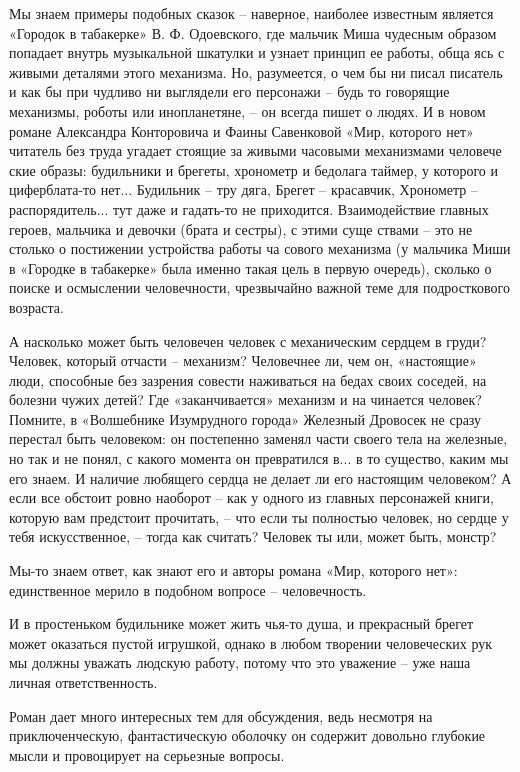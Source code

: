 Мы знаем примеры подобных сказок – наверное, наиболее известным является
«Городок в табакерке» В. Ф. Одоевского, где мальчик Миша чудесным образом
попадает внутрь музыкальной шкатулки и узнает принцип ее работы, обща ясь с
живыми деталями этого механизма.  Но, разумеется, о чем бы ни писал писатель и
как бы при чудливо ни выглядели его персонажи – будь то говорящие механизмы,
роботы или инопланетяне, – он всегда пишет о людях. И в новом романе Александра
Конторовича и Фаины Савенковой «Мир, которого нет» читатель без труда угадает
стоящие за живыми часовыми механизмами человече ские образы: будильники и
брегеты, хронометр и бедолага таймер, у которого и циферблата-то нет... Будильник
– тру дяга, Брегет – красавчик, Хронометр – распорядитель... тут даже и гадать-то
не приходится. Взаимодействие главных героев, мальчика и девочки (брата и
сестры), с этими суще ствами – это не столько о постижении устройства работы ча
сового механизма (у мальчика Миши в «Городке в табакерке» была именно такая
цель в первую очередь), сколько о поиске и осмыслении человечности,
чрезвычайно важной теме для подросткового возраста.

А насколько может быть человечен человек с механическим сердцем в груди?
Человек, который отчасти – механизм? Человечнее ли, чем он, «настоящие» люди,
способные без зазрения совести наживаться на бедах своих соседей, на болезни
чужих детей? Где «заканчивается» механизм и на чинается человек? Помните, в
«Волшебнике Изумрудного города» Железный Дровосек не сразу перестал быть
человеком: он постепенно заменял части своего тела на железные, но так и не
понял, с какого момента он превратился в... в то существо, каким мы его знаем. И
наличие любящего сердца не делает ли его настоящим человеком? А если все
обстоит ровно наоборот – как у одного из главных персонажей книги, которую вам
предстоит прочитать, – что если ты полностью человек, но сердце у тебя
искусственное, – тогда как считать? Человек ты или, может быть, монстр?

Мы-то знаем ответ, как знают его и авторы романа «Мир, которого нет»:
единственное мерило в подобном вопросе – человечность.

И в простеньком будильнике может жить чья-то душа, и прекрасный брегет может
оказаться пустой игрушкой, однако в любом творении человеческих рук мы должны
уважать людскую работу, потому что это уважение – уже наша личная
ответственность.

Роман дает много интересных тем для обсуждения, ведь несмотря на
приключенческую, фантастическую оболочку он содержит довольно глубокие мысли и
провоцирует на серьезные вопросы.


